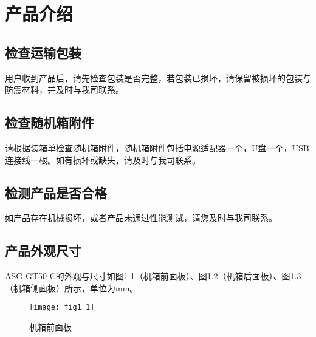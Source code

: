\chapter{\heiti 产品介绍}
{
\fancyhf{}
\renewcommand{\headrulewidth}{2.4pt}
\renewcommand{\footrulewidth}{2.4pt}
\chead{}
\cfoot{}
\fancyfoot[RO,LE]{\xiaosi\textbf{\thepage}}
}


\pagestyle{fancy}
\renewcommand{\headrulewidth}{1.5pt}
\renewcommand{\footrulewidth}{1.5pt}
\chead{}
\cfoot{}
\fancyfoot[RO,LE]{\xiaosi\textbf{\thepage}}

\setcounter{page}{1}
\setmainfont{Times New Roman}
\section{\heiti 检查运输包装}
用户收到产品后，请先检查包装是否完整，若包装已损坏，请保留被损坏的包装与防震材料，并及时与我司联系。

\section{\heiti 检查随机箱附件}
请根据装箱单检查随机箱附件，随机箱附件包括电源适配器一个，U盘一个，USB连接线一根。如有损坏或缺失，请及时与我司联系。

\section{\heiti 检测产品是否合格}
如产品存在机械损坏，或者产品未通过性能测试，请您及时与我司联系。

\section{\heiti 产品外观尺寸}
ASG-GT50-C的外观与尺寸如图1.1（机箱前面板）、图1.2（机箱后面板）、图1.3（机箱侧面板）所示，单位为mm。
\begin{figure}[ht]
\centering
\texttt{[image: fig1\_1]}
\caption{机箱前面板}\label{fig:fig1_1}
\end{figure}

